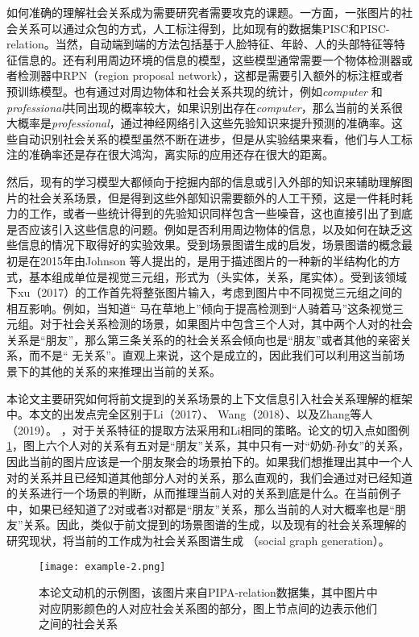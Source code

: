 如何准确的理解社会关系成为需要研究者需要攻克的课题。一方面，一张图片的社会关系可以通过众包的方式，人工标注得到，比如现有的数据集PISC\cite{li2017dual-glance}和PISC-relation\cite{sun2017a}。当然，自动端到端的方法包括基于人脸特征、年龄、人的头部特征等特征信息的\cite{sun2017a,zhang2015learning}。还有利用周边环境的信息的模型\cite{li2017dual-glance,wang2018deep}，这些模型通常需要一个物体检测器或者检测器中RPN（region proposal network），这都是需要引入额外的标注框或者预训练模型。也有通过对周边物体和社会关系共现的统计，例如{\it computer} 和{\it professional}共同出现的概率较大，如果识别出存在{\it computer}，那么当前的关系很大概率是{\it professional}，通过神经网络引入这些先验知识来提升预测的准确率。这些自动识别社会关系的模型虽然不断在进步，但是从实验结果来看，他们与人工标注的准确率还是存在很大鸿沟，离实际的应用还存在很大的距离。

然后，现有的学习模型大都倾向于挖掘内部的信息或引入外部的知识来辅助理解图片的社会关系场景，但是得到这些外部知识需要额外的人工干预，这是一件耗时耗力的工作，或者一些统计得到的先验知识同样包含一些噪音，这也直接引出了到底是否应该引入这些信息的问题。例如是否利用周边物体的信息，以及如何在缺乏这些信息的情况下取得好的实验效果。受到场景图谱生成的启发，场景图谱的概念最初是在2015年由Johnson 等人\cite{johnson2015image}提出的，是用于描述图片的一种新的半结构化的方式，基本组成单位是视觉三元组，形式为（头实体，关系，尾实体）。受到该领域下xu（2017）\cite{xu2017scene}的工作首先将整张图片输入，考虑到图片中不同视觉三元组之间的相互影响。例如，当知道`` 马在草地上''倾向于提高检测到``人骑着马''这条视觉三元组。对于社会关系检测的场景，如果图片中包含三个人对，其中两个人对的社会关系是``朋友''，那么第三条关系的的社会关系会倾向也是``朋友''或者其他的亲密关系，而不是`` 无关系''。直观上来说，这个是成立的，因此我们可以利用这当前场景下的其他的关系的来推理出当前的关系。

本论文主要研究如何将前文提到的关系场景的上下文信息引入社会关系理解的框架中。本文的出发点完全区别于Li（2017）\cite{li2017dual-glance}、
Wang（2018）\cite{wang2018deep}、以及Zhang等人（2019）\cite{zhang2019multi}。
，对于关系特征的提取方法采用和Li\cite{li2017dual-glance}相同的策略。论文的切入点如图例\ref{fig:intro-example-2}，图上六个人对的关系有五对是``朋友''关系，其中只有一对``奶奶-孙女''的关系，因此当前的图片应该是一个朋友聚会的场景拍下的。如果我们想推理出其中一个人对的关系并且已经知道其他部分人对的关系，那么直观的，我们会通过对已经知道的关系进行一个场景的判断，从而推理当前人对的关系到底是什么。在当前例子中，如果已经知道了2对或者3对都是``朋友''关系，那么当前的人对大概率也是``朋友''关系。因此，类似于前文提到的场景图谱的生成，以及现有的社会关系理解的研究现状，将当前的工作成为社会关系图谱生成
（social graph generation）。
\begin{figure}[htpb]
	\centering
	\texttt{[image: example-2.png]}
    \caption{本论文动机的示例图，该图片来自PIPA-relation数据集，其中图片中对应阴影颜色的人对应社会关系图的部分，图上节点间的边表示他们之间的社会关系}
	\vspace*{-3.5mm}
	\label{fig:intro-example-2}
\end{figure}


